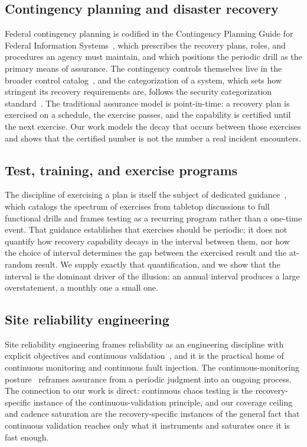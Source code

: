 \documentclass[journal]{IEEEtran}
\begin{document}
\subsection{Contingency planning and disaster recovery}
Federal contingency planning is codified in the Contingency Planning Guide for Federal Information
Systems~\cite{nist80034}, which prescribes the recovery plans, roles, and procedures an agency must
maintain, and which positions the periodic drill as the primary means of assurance. The contingency
controls themselves live in the broader control catalog~\cite{nist80053}, and the categorization of
a system, which sets how stringent its recovery requirements are, follows the security
categorization standard~\cite{fips199}. The traditional assurance model is point-in-time: a recovery
plan is exercised on a schedule, the exercise passes, and the capability is certified until the next
exercise. Our work models the decay that occurs between those exercises and shows that the certified
number is not the number a real incident encounters.

\subsection{Test, training, and exercise programs}
The discipline of exercising a plan is itself the subject of dedicated
guidance~\cite{nist80084}, which catalogs the spectrum of exercises from tabletop discussions to
full functional drills and frames testing as a recurring program rather than a one-time event. That
guidance establishes that exercises should be periodic; it does not quantify how recovery capability
decays in the interval between them, nor how the choice of interval determines the gap between the
exercised result and the at-random result. We supply exactly that quantification, and we show that
the interval is the dominant driver of the illusion: an annual interval produces a large
overstatement, a monthly one a small one.

\subsection{Site reliability engineering}
Site reliability engineering frames reliability as an engineering discipline with explicit objectives
and continuous validation~\cite{beyer2016sre}, and it is the practical home of continuous monitoring
and continuous fault injection. The continuous-monitoring posture~\cite{nist80137} reframes
assurance from a periodic judgment into an ongoing process. The connection to our work is direct:
continuous chaos testing is the recovery-specific instance of the continuous-validation principle,
and our coverage ceiling and cadence saturation are the recovery-specific instances of the general
fact that continuous validation reaches only what it instruments and saturates once it is fast enough.
\end{document}
